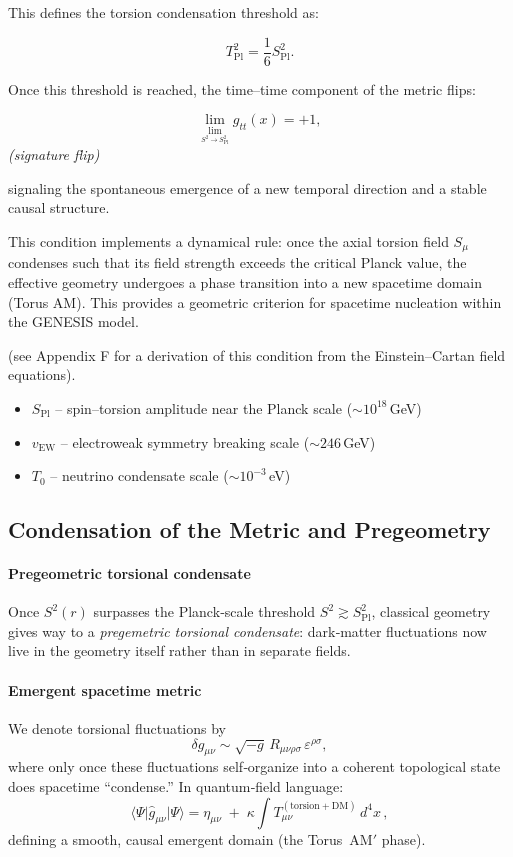 \documentclass{article}
\newcommand{\Splanck}{S_{\mathrm{Pl}}}
\newcommand{\TorsionProfile}{S^2(r)}
\begin{document}
This defines the torsion condensation threshold as:

\[
T_{\mathrm{Pl}}^2 = \frac{1}{6} S_{\mathrm{Pl}}^2.
\]

Once this threshold is reached, the time–time component of the metric flips:

\[
\lim_{\lim_{S^2 \rightarrow \Splanck^2}} g_{tt}(x) = +1,
\]
\textit{(signature flip)}

signaling the spontaneous emergence of a new temporal direction and a stable causal structure.

This condition implements a dynamical rule: once the axial torsion field \( S_\mu \) condenses such that its field strength exceeds the critical Planck value, the effective geometry undergoes a phase transition into a new spacetime domain (Torus AM). This provides a geometric criterion for spacetime nucleation within the GENESIS model.

(see Appendix F for a derivation of this condition from the Einstein–Cartan field equations).

\begin{itemize}
  \item $S_{\text{Pl}}$ – spin–torsion amplitude near the Planck scale ($\sim 10^{18}$ GeV)
  \item $v_{\text{EW}}$ – electroweak symmetry breaking scale ($\sim 246$ GeV)
  \item $T_0$ – neutrino condensate scale ($\sim 10^{-3}$ eV)
\end{itemize}




\subsection{Condensation of the Metric and Pregeometry}
\label{sec:condensation}
\paragraph{Pregeometric torsional condensate}
Once $\TorsionProfile$ surpasses the Planck‐scale threshold $S^2 \gtrsim \Splanck^2$, classical geometry gives way to a \emph{pregemetric torsional condensate}: dark‐matter fluctuations now live in the geometry itself rather than in separate fields.  

\paragraph{Emergent spacetime metric}
We denote torsional fluctuations by
\[
  \delta g_{\mu\nu}\sim\sqrt{-g}\,R_{\mu\nu\rho\sigma}\,\varepsilon^{\rho\sigma},
\]
where only once these fluctuations self‐organize into a coherent topological state does spacetime “condense.”  In quantum‐field language:
\[
  \bigl\langle\Psi\big|\hat g_{\mu\nu}\big|\Psi\bigr\rangle
   = \eta_{\mu\nu}
   \;+\;
   \kappa\int T^{(\mathrm{torsion+DM})}_{\mu\nu}\,d^4x\,,
\]
defining a smooth, causal emergent domain (the Torus~AM$'$ phase).
\end{document}
